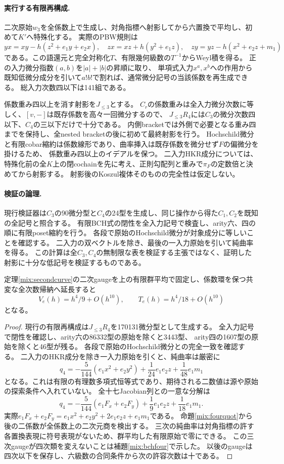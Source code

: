 \paragraph{実行する有限再構成.}
二次原始$w_3$を全係数上で生成し、対角指標へ射影してから六置換で平均し、初めて$K'$へ特殊化する。
実際のPBW規則は
\[
 yx=xy-h(z^2+e_1y+e_2x),\quad zx=xz+h(y^2+e_1z),\quad
 zy=yz-h(x^2+e_2z+m_1)
\]
である。この語還元と完全対称化$T$、有限幾何級数の$T^{-1}$からWeyl積を得る。
正の入力微分指数$(a,b)$を$|a|+|b|$の昇順に取り、
単項式入力$x^a,x^b$への作用から既知低微分成分を引いて$a!b!$で割れば、通常微分記号の当該係数を再生成できる。
総入力次数四以下は141組である。

係数重み四以上を消す射影を$J_{\le3}$とする。
$C_r$の係数重みは全入力微分次数に等しく、$[v,-]$は既存係数を高々一回微分するので、
$J_{\le3}R_4$には$C_3$の微分次数四以下、$C_4$の三以下だけで十分である。
内側bracketでは外側で必要となる重み四までを保持し、全nested bracketの後に初めて最終射影を行う。
Hochschild微分と有限cobar縮約は係数線形であり、曲率挿入は既存係数を微分せず$F$の偏微分を掛けるため、
係数重み四以上のイデアルを保つ。
二入力HKR成分については、特殊化前の全$K$上の閉cochainを先に考え、正則勾配列と重みで$\pi_F$の定数倍と決めてから射影する。
射影後のKoszul複体そのものの完全性は仮定しない。

\paragraph{検証の論理.}
現行検証器は$C_3$の90微分型と$C_4$の24型を生成し、同じ操作から得た$C_1,C_2$を既知の全記号と照合する。
有限BCH式の閉性を全入力記号で検査し、arity六、四の順に有限poset縮約を行う。
各段で原始のHochschild微分が対象成分に等しいことを確認する。
二入力の双ベクトルを除き、最後の一入力原始を引いて純曲率を得る。
この計算は全$C_3,C_4$の無制限な表を検証する主張ではなく、証明した射影に十分な低記号を検証するものである。

\begin{theorem}[固定中心の四次量子係数]\label{mix:fourth}
定理\ref{mix:secondcurve}の二次gaugeを上の有限群平均で固定し、係数環を保つ共変な全次数帰納へ延長すると
\[
 V_e(h)=h^4/9+O(h^{10}),\qquad T_e(h)=h^4/18+O(h^{10})
\]
となる。
\end{theorem}
\begin{proof}
現行の有限再構成は$J_{\le3}R_4$を170131微分型として生成する。
全入力記号で閉性を確認し、arity六の86332型の原始を除くと3443型、
arity四の1607型の原始を除くと46型が残る。
各段で原始のHochschild微分との完全一致を確認する。
二入力のHKR成分を除き一入力原始を引くと、純曲率は厳密に
\[
 q_4=-\frac5{144}(e_1x^2+e_2y^2)+\frac1{24}e_1e_2z+\frac1{48}e_1m_1
\]
となる。これは有限の有理数多項式恒等式であり、期待される二数値は源や原始の探索条件へ入れていない。
全十七Jacobian列との一意な分解は
\[
 q_4=-\frac5{144}(e_1F_x+e_2F_y)+\frac19e_1e_2z+\frac1{18}e_1m_1.
\]
実際$e_1F_x+e_2F_y=e_1x^2+e_2y^2+2e_1e_2z+e_1m_1$である。
命題\ref{mix:fourquot}から後の二係数が全係数上の二次元商を検出する。
三次の純曲率は対角指標の許す各置換表現に符号表現がないため、群平均した有限原始で零にできる。
この三次gaugeが四次類を変えないことは補題\ref{mix:bchfour}で示した。
以後のgaugeは四次以下を保存し、六級数の合同条件から次の許容次数は十である。
\end{proof}

